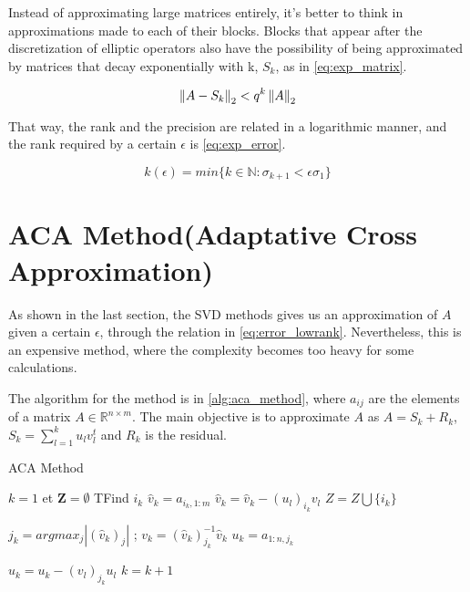 Instead of approximating large matrices entirely, it's better to think in approximations made to each of their blocks. Blocks that appear after the discretization of elliptic operators also have the possibility of being approximated by matrices that decay exponentially with k, $S_{k}$, as in \ref{eq:exp_matrix}.

\begin{equation}\label{eq:exp_matrix}
    \left\lVert A-S_{k}\right\rVert_{2} < q^{k}\left\lVert A\right\rVert_{2}
\end{equation}


That way, the rank and the precision are related in a logarithmic manner, and the rank required by a certain $\epsilon$ is \ref{eq:exp_error}.

\begin{equation}\label{eq:exp_error}
    k(\epsilon) = min\{ k \in \mathbb{N} : \sigma_{k+1} < \epsilon\sigma_{1}\}
\end{equation}

\section{ACA Method(Adaptative Cross Approximation)}

As shown in the last section, the SVD methods gives us an approximation of $A$ given a certain $\epsilon$, through the relation in \ref{eq:error_lowrank}. Nevertheless, this is an expensive method, where the complexity becomes too heavy for some calculations.

The algorithm for the method is in \ref{alg:aca_method}, where $a_{ij}$ are the elements of a matrix $A \in \mathbb{R}^{n\times m}$. The main objective is to approximate $A$ as $A=S_{k} + R_{k}$, $S_{k} = \sum_{l=1}^{k} u_{l}v_{l}^{t}$ and $R_{k}$ is the residual.



\begin{algorithm}
    \caption{ACA Method}\label{alg:aca_method}
    \begin{algorithmic}[1]
        \State $k=1$ et $\mathbf{Z} = \emptyset $
        \Repeat
        \State TFind $i_{k}$
        \State $\hat{v}_{k} = a_{i_{k},1:m} $
        \State $\hat{v}_{k} = \hat{v}_{k} - (u_{l})_{i_{k}}v_{l} $
        \EndFor
        \State $Z = Z \bigcup \{ i_{k} \} $

        \State $j_{k} = argmax_{j}|(\hat{v}_{k})_{j}|$ ; $v_{k} = (\hat{v}_{k})^{-1}_{j_{k}} \hat{v}_{k}$
        \State $u_{k}=a_{1:n,j_{k}}$

        \State $u_{k}=u_{k} - (v_{l})_{j_{k}}u_{l}$
        \EndFor
        \State $k=k+1$

        \EndIf



    \end{algorithmic}
\end{algorithm}

